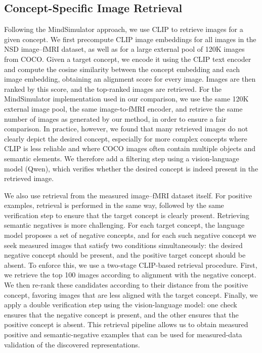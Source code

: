 \documentclass{article}
\begin{document}
\subsection{Concept-Specific Image Retrieval}
\label{sec_sup:Image_Retrieval}

Following the MindSimulator approach, we use CLIP to retrieve images for a given concept. We first precompute CLIP image embeddings for all images in the NSD image--fMRI dataset, as well as for a large external pool of 120K images from COCO. Given a target concept, we encode it using the CLIP text encoder and compute the cosine similarity between the concept embedding and each image embedding, obtaining an alignment score for every image. Images are then ranked by this score, and the top-ranked images are retrieved. For the MindSimulator implementation used in our comparison, we use the same 120K external image pool, the same image-to-fMRI encoder, and retrieve the same number of images as generated by our method, in order to ensure a fair comparison. In practice, however, we found that many retrieved images do not clearly depict the desired concept, especially for more complex concepts where CLIP is less reliable and where COCO images often contain multiple objects and semantic elements. We therefore add a filtering step using a vision-language model (Qwen), which verifies whether the desired concept is indeed present in the retrieved image.

We also use retrieval from the measured image--fMRI dataset itself. For positive examples, retrieval is performed in the same way, followed by the same verification step to ensure that the target concept is clearly present. Retrieving semantic negatives is more challenging. For each target concept, the language model proposes a set of negative concepts, and for each such negative concept we seek measured images that satisfy two conditions simultaneously: the desired negative concept should be present, and the positive target concept should be absent. To enforce this, we use a two-stage CLIP-based retrieval procedure. First, we retrieve the top 100 images according to alignment with the negative concept. We then re-rank these candidates according to their distance from the positive concept, favoring images that are less aligned with the target concept. Finally, we apply a double verification step using the vision-language model: one check ensures that the negative concept is present, and the other ensures that the positive concept is absent. This retrieval pipeline allows us to obtain measured positive and semantic-negative examples that can be used for measured-data validation of the discovered representations.
\end{document}
